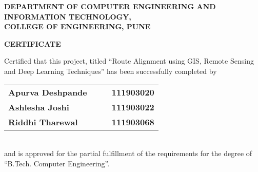 % 
\thispagestyle{empty}
\linespread{2}
\begin{center}			%
	\Large{\bf{DEPARTMENT OF COMPUTER ENGINEERING AND\\  INFORMATION TECHNOLOGY,\\ 
	       COLLEGE OF ENGINEERING, PUNE\\}}	
\end{center}

\vspace{20pt}			%

\begin{center}
	\Large{\bf{CERTIFICATE\\}}
\end{center}

\vspace{20pt}

\linespread{1.5}			%
\selectfont
\large{
Certified that this project, titled ``Route Alignment using GIS, Remote Sensing and Deep Learning Techniques''
has been successfully completed by \\ 
\begin{table}[htbp]
	\begin{center}
	\begin{tabular}{ l c c l }
	\Large\bf{Apurva Deshpande} & & & \Large\bf{111903020} \\ [0.3cm]
	\Large\bf{Ashlesha Joshi} & & & \Large\bf{111903022} \\ [0.3cm]
	\Large\bf{Riddhi Tharewal} & & & \Large\bf{111903068} \\
	\end{tabular}
	\end{center}
	\end{table} \\
and is approved for the partial fulfillment of the requirements for the degree of 
``B.Tech. Computer Engineering''.
}

\vspace{60pt}

